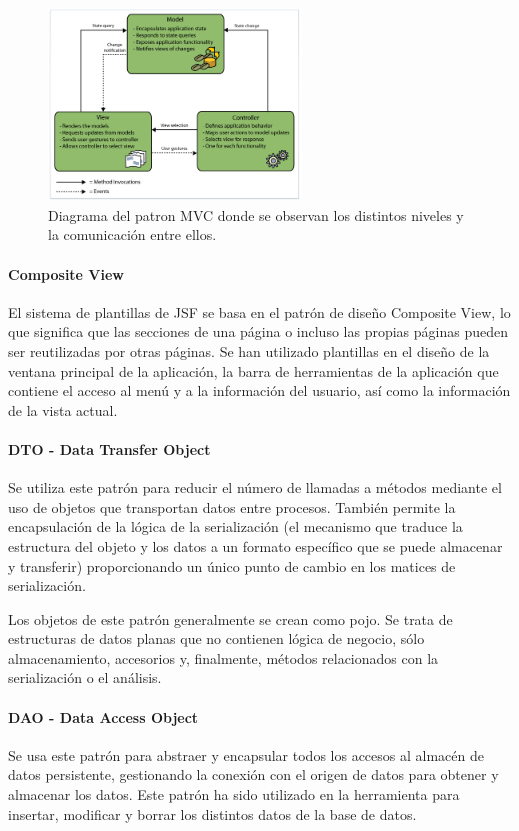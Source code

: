 \begin{figure}[H]
  \centering
  \includegraphics[width=0.6\textwidth]{imaxes/mvc-patron.png}
  \caption{Diagrama del patron MVC donde se observan los distintos niveles y la comunicación entre ellos.}
  \label{fig:patron-mvc}
\end{figure}




    
\paragraph{Composite View}
El sistema de plantillas de JSF se basa en el patrón de diseño Composite View,
lo que significa que las secciones de una página o incluso las propias páginas pueden ser reutilizadas por otras páginas.
Se han utilizado plantillas en el diseño de la ventana principal de la aplicación, la barra de herramientas de la aplicación que contiene el acceso al menú y a la información del usuario, así como la información de la vista actual.


\paragraph{DTO - Data Transfer Object}
Se utiliza este patrón para reducir el número de llamadas a métodos mediante el uso de objetos que transportan datos entre procesos. También permite la encapsulación de la lógica de la serialización (el mecanismo que traduce la estructura del objeto y los datos a un formato específico que se puede almacenar y transferir) proporcionando un único punto de cambio en los matices de serialización.

Los objetos de este patrón generalmente se crean como \acrlong{pojo}. Se trata de estructuras de datos planas que no contienen lógica de negocio, sólo  almacenamiento, accesorios y, finalmente, métodos relacionados con la serialización o el análisis.


\paragraph{DAO - Data Access Object}
Se usa este patrón para abstraer y encapsular todos los accesos al almacén de datos persistente, gestionando la conexión con el origen de datos para obtener y almacenar los datos. 
Este patrón ha sido utilizado en la herramienta para insertar, modificar y borrar los distintos datos de la base de datos.




